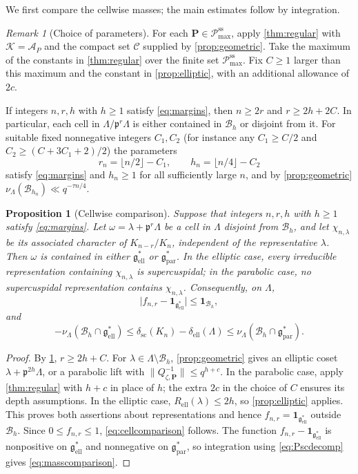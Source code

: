 \documentclass[11pt,reqno]{amsart}
\numberwithin{equation}{section}
\theoremstyle{plain}
\newtheorem{proposition}[theorem]{Proposition}
\theoremstyle{definition}
\theoremstyle{remark}
\newtheorem{remark}[theorem]{Remark}
\theoremstyle{plain}
\newcommand{\pp}{\mathfrak{p}}   %
\newcommand{\Lat}{\mathcal{L}}   %
\newcommand{\dLat}{\Lambda}      %
\newcommand{\bG}{\mathbf{G}}     %
\newcommand{\bP}{\mathbf{P}}     %
\newcommand{\g}{\mathfrak{g}}    %
\newcommand{\gd}{\mathfrak{g}^*} %
\newcommand{\Ell}[2][]{#2_{#1\mathrm{ell}}}   %
\newcommand{\Par}[2][]{#2_{#1\mathrm{par}}}
\newcommand{\scd}[1]{\delta_{\mathrm{sc}}(#1)}
\newcommand{\elld}[2][]{\delta_{\mathrm{ell}}^{#1}(#2)}  %
\newcommand{\Bad}{\mathcal{B}}   %
\newcommand{\Pcss}{\mathscr{P}^{\mathrm{ss}}_{\mathrm{max}}}  %
\newcommand{\one}{\mathbf{1}}
\newcommand{\abs}[1]{\lvert#1\rvert}
\newcommand{\norm}[1]{\lVert#1\rVert}
\newcommand{\eexp}{\tau}
\newcommand{\erad}{R_{\mathrm{ell}}}
\newcommand{\lf}{\lambda}
\newcommand{\cell}{\omega}
\newcommand{\nf}{\zeta}
\begin{document}
We first compare the cellwise masses; the main estimates follow by integration.

\begin{remark}[Choice of parameters]\label{rem:parameters}
For each $\bP\in\Pcss$, apply \cref{thm:regular} with
$\mathcal K=\mathcal A_P$ and the compact set $\mathcal C$ supplied
by \cref{prop:geometric}.
Take the maximum of the constants in \cref{thm:regular} over the
finite set $\Pcss$. Fix $C\ge1$ larger than this maximum and the
constant in \cref{prop:elliptic}, with an additional allowance of $2c$.

If integers $n,r,h$ with $h\ge1$ satisfy \eqref{eq:margins}, then $n\ge2r$ and
$r\ge2h+2C$. In particular, each cell in $\dLat/\pp^r\dLat$ is
either contained in $\Bad_h$ or disjoint from it.
For suitable fixed nonnegative integers $C_1,C_2$ (for instance any $C_1\ge C/2$ and $C_2\ge(C+3C_1+2)/2$) the parameters
\[
r_n=\lfloor n/2\rfloor-C_1,\qquad
h_n=\lfloor n/4\rfloor-C_2
\]
satisfy \eqref{eq:margins} and $h_n\ge1$ for all sufficiently large $n$,
and by \cref{prop:geometric} $\nu_{\dLat}(\Bad_{h_n})\ll q^{-\eexp n/4}$.
\end{remark}

\begin{proposition}[Cellwise comparison]\label{prop:density}
Suppose that integers $n,r,h$ with $h\ge1$ satisfy \eqref{eq:margins}.
Let $\cell=\lf+\pp^r\dLat$ be a cell in $\dLat$ disjoint from
$\Bad_h$, and let $\chi_{n,\lf}$ be its associated character of
$K_{n-r}/K_n$, independent of the representative $\lf$.
Then $\cell$ is contained in either $\Ell{\gd}$ or $\Par{\gd}$.
In the elliptic case, every irreducible representation containing
$\chi_{n,\lf}$ is supercuspidal; in the parabolic case, no
supercuspidal representation contains $\chi_{n,\lf}$.
Consequently, on $\dLat$,
\begin{equation}\label{eq:cellcomparison}
\abs{f_{n,r}-\one_{\Ell{\gd}}}\le\one_{\Bad_h},
\end{equation}
and
\begin{equation}\label{eq:masscomparison}
-\nu_{\dLat}(\Bad_h\cap\Ell{\gd})
\le\scd{K_n}-\elld{\dLat}
\le\nu_{\dLat}(\Bad_h\cap\Par{\gd}).
\end{equation}
\end{proposition}

\begin{proof}
By \cref{rem:parameters}, $r\ge2h+C$. For
$\lf\in\dLat\setminus\Bad_h$, \cref{prop:geometric} gives an elliptic
coset $\lf+\pp^{2h}\dLat$, or a parabolic lift with
$\norm{Q_{\nf,\bP}^{-1}}\le q^{h+c}$. In the parabolic case, apply
\cref{thm:regular} with $h+c$ in place of $h$; the extra $2c$ in
the choice of $C$ ensures its depth assumptions.
In the elliptic case, $\erad(\lf)\le2h$, so \cref{prop:elliptic}
applies. This proves both
assertions about representations and hence
$f_{n,r}=\one_{\Ell{\gd}}$ outside $\Bad_h$.
Since $0\le f_{n,r}\le1$, \eqref{eq:cellcomparison} follows.
The function $f_{n,r}-\one_{\Ell{\gd}}$ is nonpositive on
$\Ell{\gd}$ and nonnegative on $\Par{\gd}$, so integration using
\eqref{eq:Pscdecomp} gives \eqref{eq:masscomparison}.
\end{proof}
\end{document}

